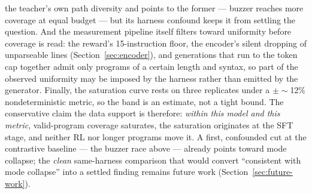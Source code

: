 the teacher's own path diversity and points to the former --- buzzer reaches more
coverage at equal budget --- but its harness confound keeps it from settling the
question. And the measurement pipeline itself filters toward uniformity before coverage
is read: the reward's 15-instruction floor, the encoder's silent dropping of
unparseable lines (Section~\ref{sec:encoder}), and generations that run to the token
cap together admit only programs of a certain length and syntax, so part of the
observed uniformity may be imposed by the harness rather than emitted by the
generator. Finally, the saturation curve rests on three replicates under a
$\pm\sim$12\% nondeterministic metric, so the band is an estimate, not a tight bound.
The conservative claim the data support is therefore:
\emph{within this model and this metric}, valid-program coverage saturates, the
saturation originates at the SFT stage, and neither RL nor longer programs move it.
A first, confounded cut at the contrastive baseline --- the buzzer race above ---
already points toward mode collapse; the \emph{clean} same-harness comparison that
would convert ``consistent with mode collapse'' into a settled finding remains future
work (Section~\ref{sec:future-work}).
